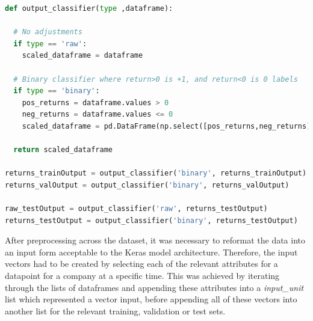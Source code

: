 \documentclass[10pt,onecolumn,letterpaper]{article}
\begin{document}
\begin{lstlisting}[language=Python, breaklines=true, caption=Function to convert the raw output target to a binary label.]
def output_classifier(type ,dataframe): 
  
  # No adjustments
  if type == 'raw':
    scaled_dataframe = dataframe
  
  # Binary classifier where return>0 is +1, and return<0 is 0 labels
  if type == 'binary':
    pos_returns = dataframe.values > 0
    neg_returns = dataframe.values <= 0 
    scaled_dataframe = pd.DataFrame(np.select([pos_returns,neg_returns], [1,0], default='NaN'), index=dataframe.index, columns=dataframe.columns)

  return scaled_dataframe

returns_trainOutput = output_classifier('binary', returns_trainOutput)
returns_valOutput = output_classifier('binary', returns_valOutput)

raw_testOutput = output_classifier('raw', returns_testOutput)
returns_testOutput = output_classifier('binary', returns_testOutput)
\end{lstlisting} 

After preprocessing across the dataset, it was necessary to reformat the data into an input form acceptable to the Keras model architecture. Therefore, the input vectors had to be created by selecting each of the relevant attributes for a datapoint for a company at a specific time. This was achieved by iterating through the lists of dataframes and appending these attributes into a \textit{input\_unit} list which represented a vector input, before appending all of these vectors into another list for the relevant training, validation or test sets.
\end{document}
